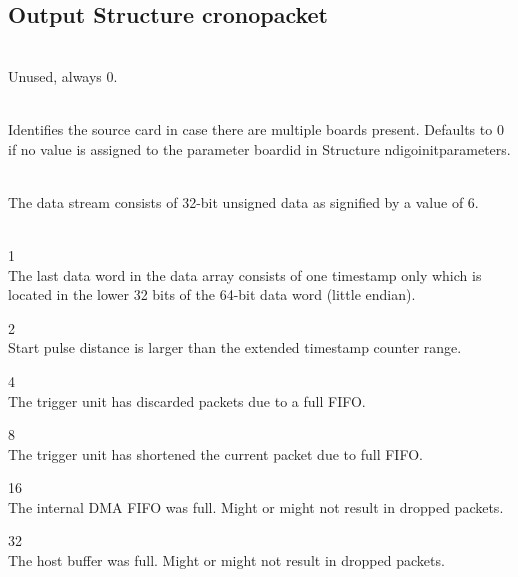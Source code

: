 \subsection{Output Structure crono\tu packet}

	\\
	Unused, always 0.\par

	\\
	Identifies the source card in case there are multiple boards present. Defaults to 0 if no value is assigned to the parameter \textsf{board\tu id} in Structure \textsf{ndigo\tu init\tu parameters}.\par

	\\
	The data stream consists of 32-bit unsigned data as signified by a value of 6.\par

	\\
	\indent{} 1\\
	\indent The last data word in the data array consists of one timestamp only which is located in the lower 32 bits of the 64-bit data word (little endian).\par
	\indent{} 2\\
	\indent Start pulse distance is larger than the extended timestamp counter range.\par
	\indent{} 4\\
	\indent The trigger unit has discarded packets due to a full FIFO.\par
	\indent{} 8\\
	\indent The trigger unit has shortened the current packet due to full FIFO.\par
	\indent{} 16\\
	\indent The internal DMA FIFO was full. Might or might not result in dropped packets.\par
	\indent{} 32\\
	\indent The host buffer was full. Might or might not result in dropped packets.\par

